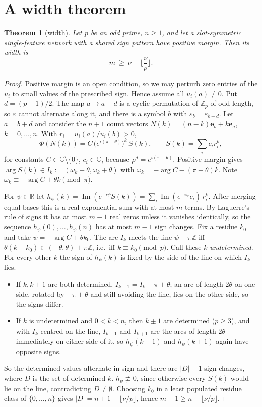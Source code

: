 \documentclass[11pt]{article}
\newtheorem{theorem}{Theorem}
\theoremstyle{definition}
\renewcommand{\Im}{\operatorname{Im}}
\begin{document}
\section{A width theorem}
\begin{theorem}[width]\label{thm:width}
Let $p$ be an odd prime, $n\ge1$, and let a slot-symmetric single-feature network with a shared sign pattern have
positive margin.  Then its width is
\[m\ \ge\ \nu-\Big\lfloor\frac{\nu}{p}\Big\rfloor .\]
\end{theorem}
\begin{proof}
Positive margin is an open condition, so we may perturb zero entries of the $u_i$ to small values of the prescribed sign.
Hence assume all $u_i(a)\ne0$.  Put $d=(p-1)/2$.  The map $a\mapsto a+d$ is a cyclic permutation of $\mathbb Z_p$ of odd
length, so $\varepsilon$ cannot alternate along it, and there is a symbol $b$ with $\varepsilon_b=\varepsilon_{b+d}$.  Let
$a=b+d$ and consider the $n+1$ count vectors $N(k)=(n-k)\mathbf e_b+k\mathbf e_a$, $k=0,\dots,n$.  With
$r_i=u_i(a)/u_i(b)>0$,
\[\Phi(N(k))=C\,\big(e^{i(\pi-\theta)}\big)^k\,S(k),\qquad S(k)=\sum_ic_ir_i^k ,\]
for constants $C\in\mathbb C\setminus\{0\}$, $c_i\in\mathbb C$, because $\rho^{d}=e^{i(\pi-\theta)}$.  Positive margin gives
$\arg S(k)\in I_k:=(\omega_k-\theta,\omega_k+\theta)$ with $\omega_k=-\arg C-(\pi-\theta)k$.  Note
$\omega_k\equiv-\arg C+\theta k\pmod\pi$.

For $\psi\in\mathbb R$ let $h_\psi(k)=\Im(e^{-i\psi}S(k))=\sum_i\Im(e^{-i\psi}c_i)\,r_i^k$.  After merging equal bases this is
a real exponential sum with at most $m$ terms.  By Laguerre's rule of signs it has at most $m-1$ real zeros unless it
vanishes identically, so the sequence $h_\psi(0),\dots,h_\psi(n)$ has at most $m-1$ sign changes.  Fix a residue $k_0$ and
take $\psi=-\arg C+\theta k_0$.  The arc $I_k$ meets the line $\psi+\pi\mathbb Z$ iff
$\theta(k-k_0)\in(-\theta,\theta)+\pi\mathbb Z$, i.e.\ iff $k\equiv k_0\pmod p$.  Call these $k$ \emph{undetermined}.  For
every other $k$ the sign of $h_\psi(k)$ is fixed by the side of the line on which $I_k$ lies.
\begin{itemize}
\item If $k,k+1$ are both determined, $I_{k+1}=I_k-\pi+\theta$; an arc of length $2\theta$ on one side, rotated by
$-\pi+\theta$ and still avoiding the line, lies on the other side, so the signs differ.
\item If $k$ is undetermined and $0<k<n$, then $k\pm1$ are determined ($p\ge3$), and with $I_k$ centred on the line,
$I_{k-1}$ and $I_{k+1}$ are the arcs of length $2\theta$ immediately on either side of it, so $h_\psi(k-1)$ and
$h_\psi(k+1)$ again have opposite signs.
\end{itemize}
So the determined values alternate in sign and there are $|D|-1$ sign changes, where $D$ is the set of determined $k$.
$h_\psi\not\equiv0$, since otherwise every $S(k)$ would lie on the line, contradicting $D\ne\emptyset$.  Choosing $k_0$ in a
least populated residue class of $\{0,\dots,n\}$ gives $|D|=n+1-\lfloor\nu/p\rfloor$, hence
$m-1\ge n-\lfloor\nu/p\rfloor$.
\end{proof}
\end{document}
